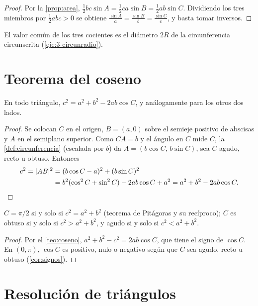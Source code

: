 \begin{proof}
Por la \cref{prop:area}, $\tfrac12 bc\sin A=\tfrac12 ca\sin B=\tfrac12 ab\sin C$. Dividiendo los tres miembros por $\tfrac12 abc>0$ se obtiene $\frac{\sin A}{a}=\frac{\sin B}{b}=\frac{\sin C}{c}$, y basta tomar inversos.
\end{proof}

El valor común de los tres cocientes es el diámetro $2R$ de la circunferencia circunscrita (\cref{eje:3-circunradio}).

\section{Teorema del coseno}

\begin{teorema}\label{teo:coseno}
En todo triángulo, $c^{2}=a^{2}+b^{2}-2ab\cos C$, y análogamente para los otros dos lados.
\end{teorema}

\begin{proof}
Se colocan $C$ en el origen, $B=(a,0)$ sobre el semieje positivo de abscisas y $A$ en el semiplano superior. Como $CA=b$ y el ángulo en $C$ mide $C$, la \cref{def:circunferencia} (escalada por $b$) da $A=(b\cos C,\,b\sin C)$, sea $C$ agudo, recto u obtuso. Entonces
\begin{align*}
c^{2}=\lvert AB\rvert^{2}&=(b\cos C-a)^{2}+(b\sin C)^{2}\\
&=b^{2}(\cos^{2}C+\sin^{2}C)-2ab\cos C+a^{2}=a^{2}+b^{2}-2ab\cos C.\qedhere
\end{align*}
\end{proof}

\begin{corolario}\label{cor:pitagoras}
$C=\pi/2$ si y solo si $c^{2}=a^{2}+b^{2}$ (teorema de Pitágoras y su recíproco); $C$ es obtuso si y solo si $c^{2}>a^{2}+b^{2}$, y agudo si y solo si $c^{2}<a^{2}+b^{2}$.
\end{corolario}

\begin{proof}
Por el \cref{teo:coseno}, $a^{2}+b^{2}-c^{2}=2ab\cos C$, que tiene el signo de $\cos C$. En $(0,\pi)$, $\cos C$ es positivo, nulo o negativo según que $C$ sea agudo, recto u obtuso (\cref{cor:signos}).
\end{proof}

\section{Resolución de triángulos}

